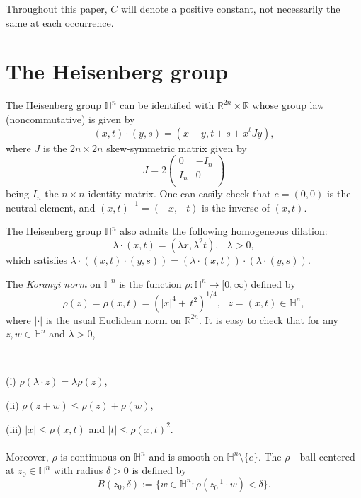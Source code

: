 \documentclass[oneside,10pt]{article}
\begin{document}
Throughout this paper, $C$ will denote a positive constant, not necessarily the same at each occurrence.


\section{The Heisenberg group} \label{Heisn}

The  Heisenberg group $\mathbb{H}^{n}$ can be identified with $\mathbb{R}^{2n} \times \mathbb{R}$ whose group law 
(noncommutative) is given by
\[
(x,t) \cdot (y,s) = \left( x+y, t+s + x^{t} J y \right),
\]
where $J$ is the $2n \times 2n$ skew-symmetric matrix given by
\[
J= 2 \left( \begin{array}{cc}
                           0 & -I_n \\
                           I_n & 0 \\
                                      \end{array} \right)
\]
being $I_n$ the $n \times n$ identity matrix. One can easily check that $e = (0,0)$ is the neutral element, and $(x, t)^{-1}=(-x, -t)$ is the inverse of $(x, t)$.

The Heisenberg group $\mathbb{H}^n$ also admits the following homogeneous dilation: 
\[
\lambda \cdot (x,t) = (\lambda x, \lambda^{2}t), \,\,\,\ \lambda > 0,
\]
which satisfies $\lambda \cdot((x,t) \cdot (y,s)) = (\lambda \cdot(x,t)) \cdot (\lambda \cdot(y,s))$. 

The {\it Koranyi norm} on $\mathbb{H}^{n}$ is the function $\rho : \mathbb{H}^{n} \to [0, \infty)$ defined by
\begin{equation} \label{Koranyi norm}
\rho(z) = \rho(x,t) = \left( |x|^{4} + \, t^{2}  \right)^{1/4}, \,\,\,\, z=(x,t) \in \mathbb{H}^{n},
\end{equation}
where $| \cdot |$ is the usual Euclidean norm on $\mathbb{R}^{2n}$. It is easy to check that for any $z, w \in \mathbb{H}^n$ and $\lambda > 0$, 

\

(i) $\rho(\lambda \cdot z) = \lambda \rho(z)$,

(ii) $\rho(z + w) \leq \rho(z) + \rho(w)$,

(iii) $|x| \leq \rho(x,t)$ and $|t| \leq \rho(x,t)^2$.
\\\\
Moreover, $\rho$ is continuous on $\mathbb{H}^{n}$ and is smooth on $\mathbb{H}^{n} \setminus \{ e \}$. The $\rho$ - ball centered at 
$z_0 \in \mathbb{H}^{n}$ with radius $\delta > 0$ is defined by
\[
B(z_0, \delta) := \{ w \in \mathbb{H}^{n} : \rho(z_0^{-1} \cdot w) < \delta \}.
\]
\end{document}
